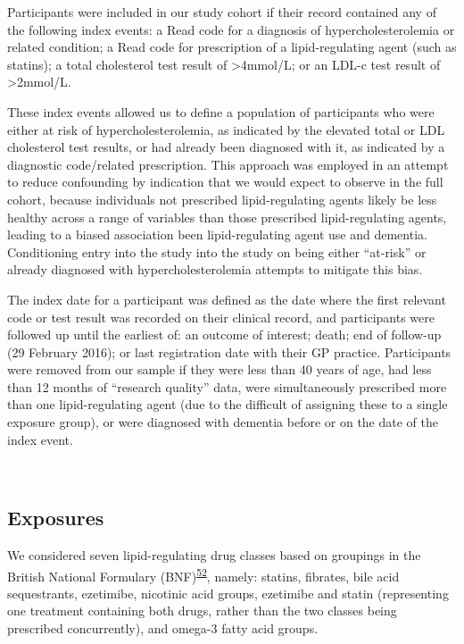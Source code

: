 \documentclass[a4paper, twoside]{templates/ociamthesis}
\begin{document}
Participants were included in our study cohort if their record contained any of the following index events: a Read code for a diagnosis of hypercholesterolemia or related condition; a Read code for prescription of a lipid-regulating agent (such as statins); a total cholesterol test result of \textgreater4mmol/L; or an LDL-c test result of \textgreater2mmol/L.

These index events allowed us to define a population of participants who were either at risk of hypercholesterolemia, as indicated by the elevated total or LDL cholesterol test results, or had already been diagnosed with it, as indicated by a diagnostic code/related prescription. This approach was employed in an attempt to reduce confounding by indication that we would expect to observe in the full cohort, because individuals not prescribed lipid-regulating agents likely be less healthy across a range of variables than those prescribed lipid-regulating agents, leading to a biased association been lipid-regulating agent use and dementia. Conditioning entry into the study into the study on being either ``at-risk'' or already diagnosed with hypercholesterolemia attempts to mitigate this bias.

The index date for a participant was defined as the date where the first relevant code or test result was recorded on their clinical record, and participants were followed up until the earliest of: an outcome of interest; death; end of follow-up (29 February 2016); or last registration date with their GP practice. Participants were removed from our sample if they were less than 40 years of age, had less than 12 months of ``research quality'' data, were simultaneously prescribed more than one lipid-regulating agent (due to the difficult of assigning these to a single exposure group), or were diagnosed with dementia before or on the date of the index event.

~

\hypertarget{exposures}{%
\subsection{Exposures}\label{exposures}}

We considered seven lipid-regulating drug classes based on groupings in the British National Formulary (BNF)\textsuperscript{\protect\hyperlink{ref-wishart2017}{52}}, namely: statins, fibrates, bile acid sequestrants, ezetimibe, nicotinic acid groups, ezetimibe and statin (representing one treatment containing both drugs, rather than the two classes being prescribed concurrently), and omega-3 fatty acid groups.
\end{document}
